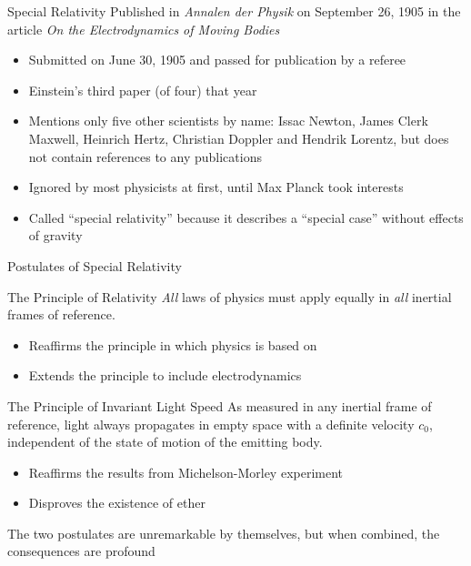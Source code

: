 \documentclass[12pt,compress,aspectratio=169]{beamer}
\begin{document}
\begin{frame}{Special Relativity}
  Published in \emph{Annalen der Physik} on September 26, 1905 in the article
  \emph{On the Electrodynamics of Moving Bodies}
  \begin{itemize}
  \item Submitted on June 30, 1905 and passed for publication by a referee
  \item Einstein's third paper (of four) that year
  \item Mentions only five other scientists by name: Issac Newton, James
    Clerk Maxwell, Heinrich Hertz, Christian Doppler and Hendrik Lorentz, but
    does not contain references to any publications
  \item Ignored by most physicists at first, until Max Planck took interests
  \item Called ``special relativity'' because it describes a ``special case''
    without effects of gravity
  \end{itemize}
\end{frame}



\begin{frame}{Postulates of Special Relativity}
  \begin{block}{The Principle of Relativity}
    \emph{All} laws of physics must apply equally in \emph{all} inertial frames
    of reference.
  \end{block}
  \begin{itemize}
  \item Reaffirms the principle in which physics is based on
  \item Extends the principle to include electrodynamics%
  \end{itemize}

  \vspace{.1in}
  \begin{block}{The Principle of Invariant Light Speed}
    As measured in any inertial frame of reference, light always propagates in
    empty space with a definite velocity $c_0$, independent of the state of
    motion of the emitting body.
  \end{block}
  \begin{itemize}
  \item Reaffirms the results from Michelson-Morley experiment
  \item Disproves the existence of ether
  \end{itemize}
%
  \vspace{.1in}The two postulates are unremarkable by themselves, but when
  combined, the consequences are profound
\end{frame}
\end{document}
